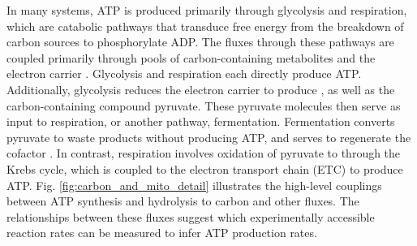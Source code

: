 \documentclass{compactarticle}
\begin{document}
In many systems, ATP is produced primarily through glycolysis and respiration, which are catabolic pathways that transduce free energy from the breakdown of carbon sources to phosphorylate ADP. The fluxes through these pathways are coupled primarily through pools of carbon-containing metabolites and the electron carrier . Glycolysis and respiration each directly produce ATP. Additionally, glycolysis reduces the electron carrier  to produce , as well as the carbon-containing compound pyruvate. These pyruvate molecules then serve as input to respiration, or another pathway, fermentation. Fermentation converts pyruvate to waste products without producing ATP, and serves to regenerate the cofactor . In contrast, respiration involves oxidation of pyruvate to  through the Krebs cycle, which is coupled to the electron transport chain (ETC) to produce ATP.
Fig. \ref{fig:carbon_and_mito_detail} illustrates the high-level couplings between ATP synthesis and hydrolysis to carbon and other fluxes. The relationships between these fluxes suggest which experimentally accessible reaction rates can be measured to infer ATP production rates.
\end{document}

